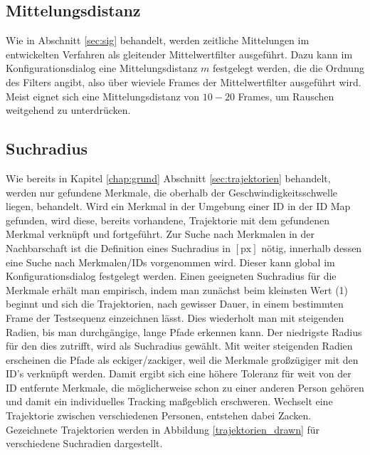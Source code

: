 \newpage

\subsection{Mittelungsdistanz}
Wie in Abschnitt \ref{sec:sig} behandelt, werden zeitliche Mittelungen im entwickelten Verfahren als gleitender Mittelwertfilter ausgeführt. Dazu kann im Konfigurationsdialog eine Mittelungsdistanz $m$ festgelegt werden, die die Ordnung des Filters angibt, also über wieviele Frames der Mittelwertfilter ausgeführt wird. Meist eignet sich eine Mittelungsdistanz von $10-20$ Frames, um Rauschen weitgehend zu unterdrücken.

\subsection{Suchradius}
Wie bereits in Kapitel \ref{chap:grund} Abschnitt \ref{sec:trajektorien} behandelt, werden nur gefundene Merkmale, die oberhalb der Geschwindigkeitsschwelle liegen, behandelt. Wird ein Merkmal in der Umgebung einer ID in der ID Map gefunden, wird diese, bereits vorhandene, Trajektorie mit dem gefundenen Merkmal verknüpft und fortgeführt. Zur Suche nach Merkmalen in der Nachbarschaft ist die Definition eines Suchradius in $[\text{px}]$ nötig, innerhalb dessen eine Suche nach Merkmalen/IDs vorgenommen wird. Dieser kann global im Konfigurationsdialog festgelegt werden. Einen geeigneten Suchradius für die Merkmale erhält man empirisch, indem man zunächst beim kleinsten Wert (1) beginnt und sich die Trajektorien, nach gewisser Dauer, in einem bestimmten Frame der Testsequenz einzeichnen lässt. Dies wiederholt man mit steigenden Radien, bis man durchgängige, lange Pfade erkennen kann. Der niedrigste Radius für den dies zutrifft, wird als Suchradius gewählt. Mit weiter steigenden Radien erscheinen die Pfade als eckiger/zackiger, weil die Merkmale großzügiger mit den ID's verknüpft werden. Damit ergibt sich eine höhere Toleranz für weit von der ID entfernte Merkmale, die möglicherweise schon zu einer anderen Person gehören und damit ein individuelles Tracking maßgeblich erschweren. Wechselt eine Trajektorie zwischen verschiedenen Personen, entstehen dabei Zacken. Gezeichnete Trajektorien werden in Abbildung \ref{trajektorien_drawn} für verschiedene Suchradien dargestellt.

